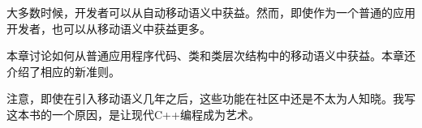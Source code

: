 大多数时候，开发者可以从自动移动语义中获益。然而，即使作为一个普通的应用开发者，也可以从移动语义中获益更多。\par

本章讨论如何从普通应用程序代码、类和类层次结构中的移动语义中获益。本章还介绍了相应的新准则。\par

注意，即使在引入移动语义几年之后，这些功能在社区中还是不太为人知晓。我写这本书的一个原因，是让现代C++编程成为艺术。\par